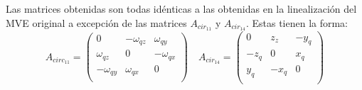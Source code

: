 Las matrices obtenidas son todas id\'enticas a las obtenidas en la linealizaci\'on del MVE original a excepci\'on de las matrices $A_{cir_{11}}$ y $A_{cir_{14}}$. Estas tienen la forma:
\begin{equation}
A_{circ_{11}}=\left(\begin{array}{ccc}
0 & -\omega_{qz} & \omega_{qy} \\
\omega_{qz} & 0 & -\omega_{qx}\\
-\omega_{qy} & \omega_{qx} &0\\

\end{array}\right) \quad 
A_{cir_{14}}=\left(\begin{array}{ccc}
0 & z_{z} & -y_{q} \\
-z_{q} & 0 & x_{q}\\
y_{q} & -x_{q} &0\\
\end{array}\right)
\end{equation}

%